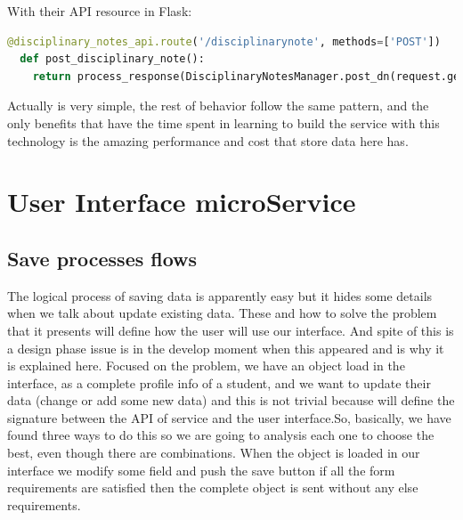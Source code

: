 \noindent With their API resource in Flask:

\begin{lstlisting}[language=python, frame=none]
  @disciplinary_notes_api.route('/disciplinarynote', methods=['POST'])
  def post_disciplinary_note():
    return process_response(DisciplinaryNotesManager.post_dn(request.get_json()))
\end{lstlisting}

\noindent Actually is very simple, the rest of behavior follow the same pattern,
and the only benefits that have the time spent in learning to build the service
with this technology is the amazing performance and cost that store data here has.

\section{User Interface microService}

\subsection{Save processes flows}

The logical process of saving data is apparently easy but it hides some details
when we talk about update existing data. These and how to solve the problem that
it presents will define how the user will use our interface. And spite of this is
a design phase issue is in the develop moment when this appeared and is why it
is explained here.
\intro
Focused on the problem, we have an object load in the interface, as a complete
profile info of a student, and we want to update their data (change or add some
new data) and this is not trivial because will define the signature between the
API of service and the user interface.So, basically, we have found three ways to do this so we are going to analysis
each one to choose the best, even though there are combinations.
When the object is loaded in our interface we modify some field and push the save
button if all the form requirements are satisfied then the complete object is sent
without any else requirements.


